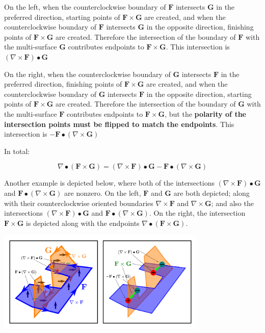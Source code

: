 On the left, when the counterclockwise boundary of \(\mathbf{F}\) intersects \(\mathbf{G}\) in the preferred direction, starting points of \(\mathbf{F} \times \mathbf{G}\) are created, and when the counterclockwise boundary of \(\mathbf{F}\) intersects \(\mathbf{G}\) in the opposite direction, finishing points of \(\mathbf{F} \times \mathbf{G}\) are created. Therefore the intersection of the boundary of \(\mathbf{F}\) with the multi-surface \(\mathbf{G}\) contributes endpoints to \(\mathbf{F} \times \mathbf{G}\). This intersection is \((\nabla \times \mathbf{F}) \bullet \mathbf{G}\)

On the right, when the counterclockwise boundary of \(\mathbf{G}\) intersects \(\mathbf{F}\) in the preferred direction, finishing points of \(\mathbf{F} \times \mathbf{G}\) are created, and when the counterclockwise boundary of \(\mathbf{G}\) intersects \(\mathbf{F}\) in the opposite direction, starting points of \(\mathbf{F} \times \mathbf{G}\) are created. Therefore the intersection of the boundary of \(\mathbf{G}\) with the multi-surface \(\mathbf{F}\) contributes endpoints to \(\mathbf{F} \times \mathbf{G}\), but the {\bf polarity of the intersection points must be flipped to match the endpoints}. This intersection is \(-\mathbf{F} \bullet (\nabla \times \mathbf{G})\)

In total:
\begin{thm}
\[\nabla \bullet (\mathbf{F} \times \mathbf{G}) = (\nabla \times \mathbf{F}) \bullet \mathbf{G} - \mathbf{F} \bullet (\nabla \times \mathbf{G})\]
\end{thm}

Another example is depicted below, where both of the intersections \((\nabla \times \mathbf{F}) \bullet \mathbf{G}\) and \(\mathbf{F} \bullet (\nabla \times \mathbf{G})\) are nonzero. On the left, \(\mathbf{F}\) and \(\mathbf{G}\) are both depicted; along with their counterclockwise oriented boundaries \(\nabla \times \mathbf{F}\) and \(\nabla \times \mathbf{G}\); and also the intersections \((\nabla \times \mathbf{F}) \bullet \mathbf{G}\) and \(\mathbf{F} \bullet (\nabla \times \mathbf{G})\). On the right, the intersection \(\mathbf{F} \times \mathbf{G}\) is depicted along with the endpoints \(\nabla \bullet (\mathbf{F} \times \mathbf{G})\).

\begin{center}
\includegraphics[width = 0.75\textwidth]{Boundaries/Path_endpoints/surface_surface_intersection_endpoints}
\end{center}

